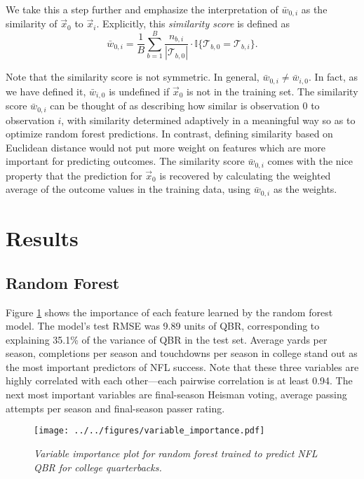 \documentclass{article}
\begin{document}
We take this a step further and emphasize the interpretation of $\bar w_{0,i}$ as the similarity of $\vec x_0$ to $\vec x_i$. Explicitly, this {\it similarity score} is defined as
\begin{equation}
  \bar w_{0,i} = \frac{1}{B}\sum_{b = 1}^B
    \frac{n_{b,i}}{|\mathcal{T}_{b,0}|} \cdot \mathbb{I}\{\mathcal{T}_{b,0} = \mathcal{T}_{b,i}\}.
\end{equation}

Note that the similarity score is not symmetric. In general, $\bar w_{0,i} \ne \bar w_{i,0}$. In fact, as we have defined it, $\bar w_{i,0}$ is undefined if $\vec x_0$ is not in the training set. The similarity score $\bar w_{0,i}$ can be thought of as describing how similar is observation 0 to observation $i$, with similarity determined adaptively in a meaningful way so as to optimize random forest predictions. In contrast, defining similarity based on Euclidean distance would not put more weight on features which are more important for predicting outcomes. The similarity score $\bar w_{0,i}$ comes with the nice property that the prediction for $\vec x_0$ is recovered by calculating the weighted average of the outcome values in the training data, using $\bar w_{0,i}$ as the weights.

\section{Results}
\label{sec:results}

\subsection{Random Forest}

Figure \ref{fig:importance} shows the importance of each feature learned by the random forest model. The model's test RMSE was 9.89 units of QBR, corresponding to explaining 35.1\% of the variance of QBR in the test set. Average yards per season, completions per season and touchdowns per season in college stand out as the most important predictors of NFL success. Note that these three variables are highly correlated with each other---each pairwise correlation is at least 0.94. The next most important variables are final-season Heisman voting, average passing attempts per season and final-season passer rating.

\begin{figure}[H]
    \centering
    \texttt{[image: ../../figures/variable\_importance.pdf]}
    \caption{\textit{Variable importance plot for random forest trained to predict NFL QBR for college quarterbacks.}}
    \label{fig:importance}
\end{figure}
\end{document}
